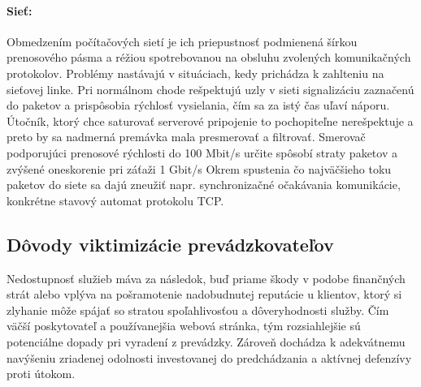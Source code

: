 \documentclass[12pt, a4paper]{article}
\begin{document}
\paragraph{Sieť:}
Obmedzením počítačových sietí je ich priepustnosť podmienená šírkou prenosového pásma a réžiou 
spotrebovanou na obsluhu zvolených komunikačných protokolov. Problémy nastávajú v situáciach, kedy prichádza
k zahlteniu na sieťovej linke. Pri normálnom chode rešpektujú uzly v sieti signalizáciu zaznačenú do 
paketov a prispôsobia rýchlosť vysielania, čím sa za istý čas uľaví náporu. Útočník, ktorý chce saturovať 
serverové pripojenie to  pochopiteľne nerešpektuje a preto by sa nadmerná premávka mala presmerovať a 
filtrovať. Smerovač podporujúci prenosové rýchlosti do 100 Mbit/s určite spôsobí straty paketov a zvýšené 
oneskorenie pri záťaži 1 Gbit/s Okrem spustenia čo najväčšieho toku paketov do siete sa dajú zneužiť napr. 
synchronizačné očakávania komunikácie, konkrétne stavový automat protokolu TCP.

\subsection{Dôvody viktimizácie prevádzkovateľov}
Nedostupnosť služieb máva za následok, buď priame škody v podobe finančných strát alebo vplýva na 
pošramotenie nadobudnutej reputácie u klientov, ktorý si zlyhanie môže spájať so stratou spoľahlivosťou a 
dôveryhodnosti služby. Čím väčší poskytovateľ a používanejšia webová stránka, tým rozsiahlejšie sú 
potenciálne dopady pri vyradení z prevádzky. Zároveň dochádza k adekvátnemu navýšeniu zriadenej odolnosti 
investovanej do predchádzania a aktívnej defenzívy proti útokom.  
\end{document}
